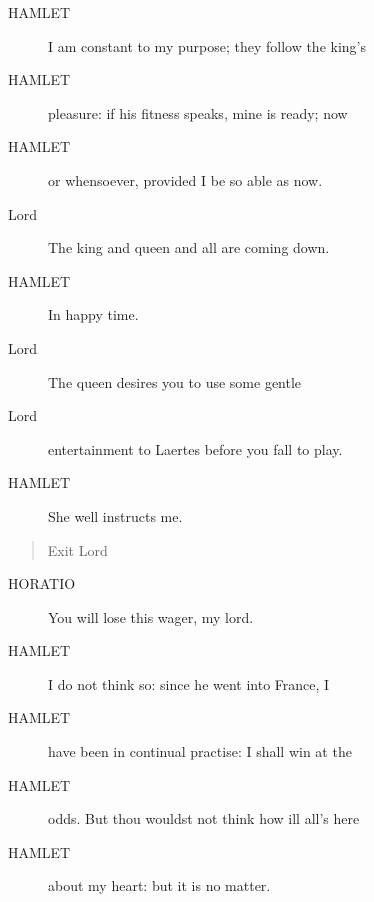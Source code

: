 \documentclass{article}
\begin{document}
\begin{description}
            
\item[HAMLET] I am constant to my purpose; they follow the king's
\item[HAMLET] pleasure: if his fitness speaks, mine is ready; now
\item[HAMLET] or whensoever, provided I be so able as now.
\end{description}
          
\begin{description}
            
\item[Lord] The king and queen and all are coming down.
\end{description}
          
\begin{description}
            
\item[HAMLET] In happy time.
\end{description}
          
\begin{description}
            
\item[Lord] The queen desires you to use some gentle
\item[Lord] entertainment to Laertes before you fall to play.
\end{description}
          
\begin{description}
            
\item[HAMLET] She well instructs me.
\end{description}
          
\begin{quote}
Exit Lord
\end{quote}
          
\begin{description}
            
\item[HORATIO] You will lose this wager, my lord.
\end{description}
          
\begin{description}
            
\item[HAMLET] I do not think so: since he went into France, I
\item[HAMLET] have been in continual practise: I shall win at the
\item[HAMLET] odds. But thou wouldst not think how ill all's here
\item[HAMLET] about my heart: but it is no matter.
\end{description}
          
\end{document}
